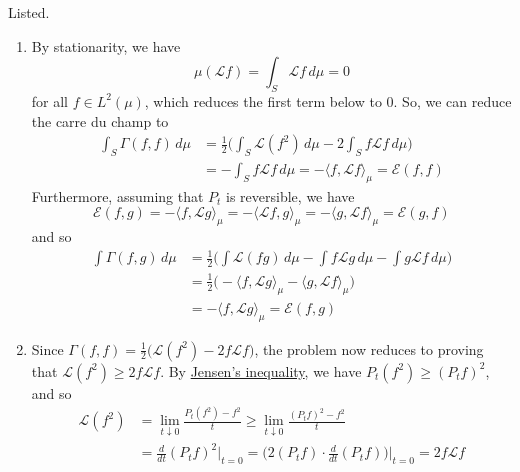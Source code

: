   \begin{solution}
    Listed. 
    \begin{enumerate}
      \item By stationarity, we have 
      \begin{equation}
        \mu ( \mathscr{L} f) = \int_S \mathscr{L} f \, d\mu = 0
      \end{equation}
      for all $f \in L^2 (\mu)$, which reduces the first term below to $0$. So, we can reduce the carre du champ to 
      \begin{align}
        \int_S \Gamma(f, f) \, d\mu & = \frac{1}{2} \bigg( \int_S \mathscr{L} (f^2) \, d\mu - 2 \int_S f \mathscr{L} f \, d\mu \bigg) \\
        & = - \int_S f \mathscr{L} f \, d\mu = - \langle f, \mathscr{L} f \rangle_\mu = \mathcal{E}(f, f)
      \end{align}
      Furthermore, assuming that $P_t$ is reversible, we have 
      \begin{equation}
        \mathcal{E}(f, g) = - \langle f, \mathscr{L} g \rangle_\mu = -\langle \mathscr{L} f, g \rangle_\mu = - \langle g, \mathscr{L} f \rangle_\mu = \mathcal{E}(g, f)
      \end{equation}
      and so 
      \begin{align}
        \int \Gamma (f, g) \, d\mu & = \frac{1}{2} \bigg( \int \mathscr{L}(f g) \, d\mu - \int f \mathscr{L} g \, d\mu - \int g \mathscr{L} f \, d\mu \bigg) \\
        & = \frac{1}{2} \big( - \langle f, \mathscr{L} g \rangle_\mu - \langle g, \mathscr{L} f\rangle_\mu \big) \\
        & = - \langle f, \mathscr{L} g \rangle_\mu = \mathcal{E}(f, g)
      \end{align}
      
      \item Since $\Gamma(f, f) = \frac{1}{2} \big( \mathscr{L} (f^2) - 2 f \mathscr{L}f \big)$, the problem now reduces to proving that $\mathscr{L} (f^2) \geq 2 f \mathscr{L}f$. By \hyperref[thm:jensens-inequality]{Jensen's inequality}, we have $P_t (f^2) \geq (P_t f)^2$, and so 
      \begin{align}
        \mathscr{L}(f^2) & = \lim_{t \downarrow 0} \frac{P_t (f^2) - f^2}{t} \geq \lim_{t \downarrow 0} \frac{(P_t f)^2 - f^2}{t} \\
        & = \frac{d}{dt} (P_t f)^2 \bigg|_{t = 0} = \bigg( 2 (P_t f) \cdot \frac{d}{dt} (P_t f) \bigg)\bigg|_{t = 0} = 2 f \mathscr{L} f
      \end{align}
      

\end{enumerate}
\end{solution}
